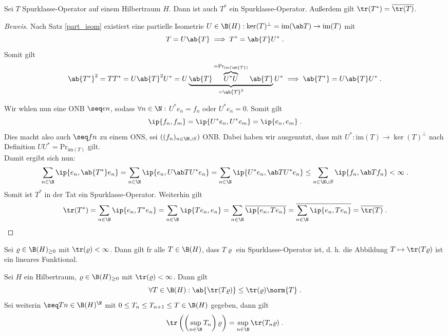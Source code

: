 \begin{theorem}
	Sei $T$ Spurklasse-Operator auf einem Hilbertraum $H$. Dann ist auch $T^*$ ein Spurklasse-Operator. Au\ss{}erdem gilt \(\tr(T^*) = \overline{\tr(T)}\).
\end{theorem}
\begin{proof}[Beweis]
	Nach Satz \ref{part_isom} existiert eine partielle Isometrie \(U\in\B(H): \ker(T)^\perp = \text{im}(\ab T) \to \text{im}(T)\) mit
	\[T = U\ab{T} \implies T^* = \ab{T}U^*\;.\]
	Somit gilt 
	\[\ab{T^*}^2 = TT^* = U\ab{T}^2 U^* = U\underbrace{\ab{T}\overbrace{U^* U}^{=\text{Pr}_{\text{im}(\ab{T})}} \ab{T}}_{=\ab{T}^2} U^* \implies \ab{T^*} = U\ab{T} U^*\;.\]
	
	Wir w\as hlen nun eine ONB \(\seq en\), sodass \(\forall n \in\N:\) \(U^* e_n = f_n\) oder \(U^* e_n = 0\). Somit gilt
	\[\ip{f_n, f_m} = \ip{U^* e_n, U^* e_m} = \ip{e_n, e_m} \;.\]
	Dies macht also auch \(\seq f n\) zu einem ONS, sei \(((f_n)_{n\in\N\cup S})\) ONB. Dabei haben wir ausgenutzt, dass mit \(U^*:  \text{im}(T) \to \ker(T)^\perp\) nach Definition \(UU^* = \text{Pr}_{\text{im}(T)}\) gilt.\\
	Damit ergibt sich nun:
	\[\sum_{n\in\N}\ip{e_n, \ab{T^*} e_n} = \sum_{n\in\N}\ip{e_n, U\ab T U^* e_n} = \sum_{n\in\N}\ip{U^* e_n, \ab T U^* e_n} \leq \sum_{n\in\N\cup S} \ip{f_n, \ab T f_n} < \infty\;.\]
	Somit ist \(T^*\) in der Tat ein Spurklasse-Operator. Weiterhin gilt
	\[\tr(T^*) = \sum_{n\in\N} \ip{e_n, T^* e_n}  = \sum_{n\in\N}\ip{Te_n, e_n} = \sum_{n\in\N} \overline{\ip{e_n, T e_n}} = \overline{\sum_{n\in\N}\ip{e_n, Te_n}} = \overline{\tr(T)}\;.\]
\end{proof}

\begin{rem}
	Sei \(\varrho\in \B(H)_{\geq 0}\) mit \(\tr(\varrho)<\infty\). Dann gilt f\us r alle \(T \in \B(H)\), dass \(T\varrho\) ein Spurklasse-Operator ist, d. h. die Abbildung \(T\mapsto \tr(T\varrho)\) ist ein lineares Funktional.
\end{rem}

\begin{theorem}
	Sei $H$ ein Hilbertraum, \(\varrho \in \B(H)_{\geq 0}\) mit \(\tr(\varrho) < \infty\). Dann gilt
	\[\forall T\in \B(H): \ab{\tr(T\varrho)} \leq \tr(\varrho) \norm{T}\;.\]
	Sei weiterin \(\seq Tn \in \B(H)^\N\) mit \(0\leq T_n\leq T_{n+1} \leq T\in \B(H)\) gegeben, dann gilt
	\[\tr\left(\left(\sup_{n\in\N}T_n\right)\varrho\right) = \sup_{n\in\N} \tr(T_n\varrho)\;.\] 
\end{theorem}

